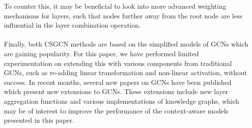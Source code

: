 To counter this, it may be beneficial to look into more advanced weighting mechanisms for layers, such that nodes further away from the root node are less influential in the layer combination operation.
\\\\
Finally, both CSGCN methods are based on the simplified models of GCNs which are gaining popularity.
For this paper, we have performed limited experimentation on extending this with various components from traditional GCNs, such as re-adding linear transformation and non-linear activation, without success.
In recent months, several new papers on GCNs have been published which present new extensions to GCNs.
These extensions include new layer aggregation functions and various implementations of knowledge graphs, which may be of interest to improve the performance of the context-aware models presented in this paper.
